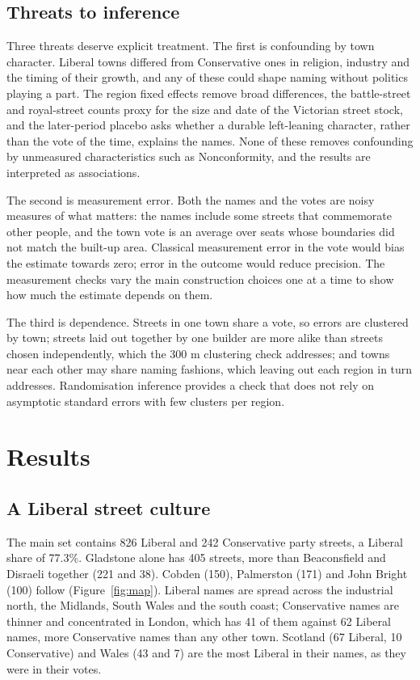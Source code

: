 \documentclass[11pt,a4paper]{article}
\begin{document}
\subsection{Threats to inference}
Three threats deserve explicit treatment. The first is confounding by town character. Liberal towns differed from Conservative ones in religion, industry and the timing of their growth, and any of these could shape naming without politics playing a part. The region fixed effects remove broad differences, the battle-street and royal-street counts proxy for the size and date of the Victorian street stock, and the later-period placebo asks whether a durable left-leaning character, rather than the vote of the time, explains the names. None of these removes confounding by unmeasured characteristics such as Nonconformity, and the results are interpreted as associations.

The second is measurement error. Both the names and the votes are noisy measures of what matters: the names include some streets that commemorate other people, and the town vote is an average over seats whose boundaries did not match the built-up area. Classical measurement error in the vote would bias the estimate towards zero; error in the outcome would reduce precision. The measurement checks vary the main construction choices one at a time to show how much the estimate depends on them.

The third is dependence. Streets in one town share a vote, so errors are clustered by town; streets laid out together by one builder are more alike than streets chosen independently, which the 300 m clustering check addresses; and towns near each other may share naming fashions, which leaving out each region in turn addresses. Randomisation inference provides a check that does not rely on asymptotic standard errors with few clusters per region.

\section{Results}
\subsection{A Liberal street culture}
The main set contains 826 Liberal and 242 Conservative party streets, a Liberal share of 77.3\%. Gladstone alone has 405 streets, more than Beaconsfield and Disraeli together (221 and 38). Cobden (150), Palmerston (171) and John Bright (100) follow (Figure~\ref{fig:map}). Liberal names are spread across the industrial north, the Midlands, South Wales and the south coast; Conservative names are thinner and concentrated in London, which has 41 of them against 62 Liberal names, more Conservative names than any other town. Scotland (67 Liberal, 10 Conservative) and Wales (43 and 7) are the most Liberal in their names, as they were in their votes.
\end{document}
